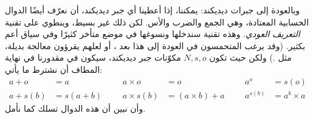 \documentclass[../../../include/open-logic-section]{subfiles}
\begin{document}
وبالعودة إلى جبرات ديديكند: يمكننا، إذا أعطينا أي جبر ديديكند، أن نعرّف
أيضًا الدوال الحسابية المعتادة، وهي الجمع والضرب والأس. لكن ذلك غير
بسيط، وينطوي على تقنية \emph{التعريف العودي}. وهذه تقنية سندخلها
ونسوغها في موضع متأخر كثيرًا وفي سياق أعم بكثير. (وقد يرغب المتحمسون
في العودة إلى هذا بعد ، أو لعلهم
يقرؤون معالجة بديلة، مثل \citealt[صص.~95--8]{Potter2004}.) ولكن حيث
تكون $N, s, o$ مكوّنات جبر ديديكند، سيكون في مقدورنا في نهاية المطاف أن نشترط
ما يأتي:
\begin{align*}
	{a} + {o} &= {a} & & & {a} \times {o} &= {o} & & & {a}^{o} &= s(o)\\
{a} + {s}({b}) &= {s}({a}+{b}) &&& {a} \times {s}({b}) &= ({a}\times {b}) + {a}  & & & {a}^{{s}({b})} &= {a}^{b} \times {a}
\end{align*}
وأن نبين أن هذه الدوال تسلك كما نأمل.
\end{document}
